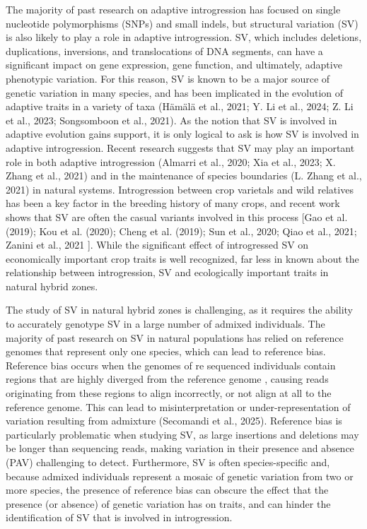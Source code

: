 \documentclass[
]{agujournal2019}
\begin{document}
The majority of past research on adaptive introgression has focused on
single nucleotide polymorphisms (SNPs) and small indels, but structural
variation (SV) is also likely to play a role in adaptive introgression.
SV, which includes deletions, duplications, inversions, and
translocations of DNA segments, can have a significant impact on gene
expression, gene function, and ultimately, adaptive phenotypic
variation. For this reason, SV is known to be a major source of genetic
variation in many species, and has been implicated in the evolution of
adaptive traits in a variety of taxa (Hämälä et al., 2021; Y. Li et al.,
2024; Z. Li et al., 2023; Songsomboon et al., 2021). As the notion that
SV is involved in adaptive evolution gains support, it is only logical
to ask is how SV is involved in adaptive introgression. Recent research
suggests that SV may play an important role in both adaptive
introgression (Almarri et al., 2020; Xia et al., 2023; X. Zhang et al.,
2021) and in the maintenance of species boundaries (L. Zhang et al.,
2021) in natural systems. Introgression between crop varietals and wild
relatives has been a key factor in the breeding history of many crops,
and recent work shows that SV are often the casual variants involved in
this process {[}Gao et al. (2019); Kou et al. (2020); Cheng et al.
(2019); Sun et al., 2020; Qiao et al., 2021; Zanini et al., 2021 {]}.
While the significant effect of introgressed SV on economically
important crop traits is well recognized, far less in known about the
relationship between introgression, SV and ecologically important traits
in natural hybrid zones.

The study of SV in natural hybrid zones is challenging, as it requires
the ability to accurately genotype SV in a large number of admixed
individuals. The majority of past research on SV in natural populations
has relied on reference genomes that represent only one species, which
can lead to reference bias. Reference bias occurs when the genomes of re
sequenced individuals contain regions that are highly diverged from the
reference genome , causing reads originating from these regions to align
incorrectly, or not align at all to the reference genome. This can lead
to misinterpretation or under-representation of variation resulting from
admixture (Secomandi et al., 2025). Reference bias is particularly
problematic when studying SV, as large insertions and deletions may be
longer than sequencing reads, making variation in their presence and
absence (PAV) challenging to detect. Furthermore, SV is often
species-specific and, because admixed individuals represent a mosaic of
genetic variation from two or more species, the presence of reference
bias can obscure the effect that the presence (or absence) of genetic
variation has on traits, and can hinder the identification of SV that is
involved in introgression.
\end{document}
